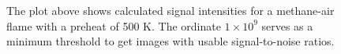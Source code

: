 \begin{figure}

\centering



\caption[Methane flames - II]{The plot above shows calculated signal intensities for a methane-air flame with a preheat of 500 K. The ordinate \(1\times10^9\) serves as a minimum threshold to get images with usable signal-to-noise ratios.}

\label{fig:01-500}

\end{figure}
